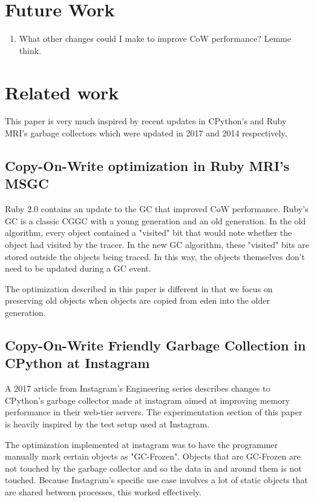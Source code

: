 \documentclass{article}
\begin{document}
  \section{Future Work}
  \begin{enumerate}
	\item What other changes could I make to improve CoW performance?  Lemme think.
  \end{enumerate}

  \section{Related work}

  This paper is very much inspired by recent updates in CPython's and Ruby MRI's garbage collectors which were updated in 2017 and 2014 respectively.  

  \subsection{Copy-On-Write optimization in Ruby MRI's MSGC}
  Ruby 2.0 contains an update to the GC that improved CoW performance.  Ruby's GC is a classic CGGC with a young generation and an old generation.  In the old algorithm, every object contained a "visited" bit that would note whether the object had visited by the tracer.  In the new GC algorithm, these "visited" bits are stored outside the objects being traced.  In this way, the objects themselves don't need to be updated during a GC event.  

  The optimization described in this paper is different in that we focus on preserving old objects when objects are copied from eden into the older generation.  

  \subsection{Copy-On-Write Friendly Garbage Collection in CPython at Instagram}
  A 2017 article from Instagram's Engineering series describes changes to CPython's garbage collector made at instagram aimed at improving memory performance in their web-tier servers.  The experimentation section of this paper is heavily inspired by the test setup used at Instagram.

  The optimization implemented at instagram was to have the programmer manually mark certain objects as "GC-Frozen".  Objects that are GC-Frozen are not touched by the garbage collector and so the data in and around them is not touched.  Because Instagram's specific use case involves a lot of static objects that are shared between processes, this worked effectively.  

  \newpage
  \onecolumn
  \nocite{*}
  
  
\end{document}
